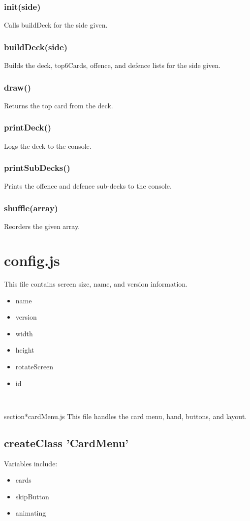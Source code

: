 \documentclass[12pt]{article}
\begin{document}
\subsubsection*{init(side)}
Calls buildDeck for the side given. 
\subsubsection*{buildDeck(side)}
Builds the deck, top6Cards, offence, and defence lists for the side given.
\subsubsection*{draw()}
Returns the top card from the deck. 
\subsubsection*{printDeck()}
Logs the deck to the console. 
\subsubsection*{printSubDecks()}
Prints the offence and defence sub-decks to the console. 
\subsubsection*{shuffle(array)}
Reorders the given array. 


\section*{config.js}
This file contains screen size, name, and version information. 
\begin{itemize}
\item name
\item version
\item width
\item height 
\item rotateScreen
\item id
\end{itemize}
\

section*{cardMenu.js}
This file handles the card menu, hand, buttons, and layout. 
\subsection*{createClass 'CardMenu'}
Variables include:
\begin{itemize}
\item cards
\item skipButton
\item animating
\end{itemize}
\end{document}
